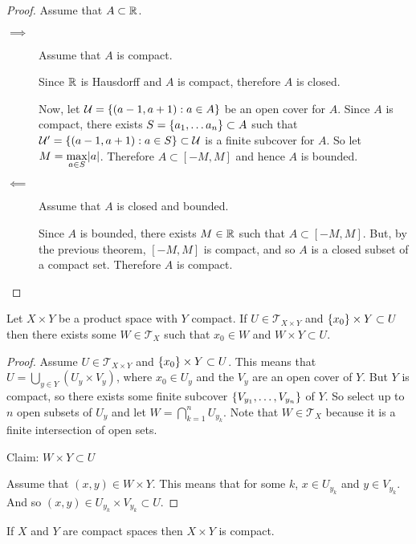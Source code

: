 \documentclass[letterpaper,12pt,fleqn]{article}
\newcommand{\T}{\mathscr{T}}
\newcommand{\U}{\mathcal{U}}
\begin{document}
\begin{proof}
  Assume that \(A\subset\mathbb{R}\).
  \begin{description}
  \item[\(\implies\)] Assume that \(A\) is compact.

    Since \(\mathbb{R}\) is Hausdorff and \(A\) is compact, therefore \(A\) is closed.

    Now, let \(\U=\set{(a-1,a+1):a\in A}\) be an open cover for \(A\).  Since \(A\) is compact, there exists
    \(S=\{a_1,\ldots a_n\}\subset A\) such that \(\U'=\set{(a-1,a+1):a\in S}\subset\U\) is a finite subcover for
    \(A\).  So let \(\displaystyle M=\max_{a\in S}\lvert a\rvert\).  Therefore \(A\subset[-M,M]\) and hence \(A\) is bounded.

  \item[\(\impliedby\)] Assume that \(A\) is closed and bounded.

    Since \(A\) is bounded, there exists \(M\in\mathbb{R}\) such that \(A\subset[-M,M]\).  But, by the previous theorem,
    \([-M,M]\) is compact, and so \(A\) is a closed subset of a compact set.  Therefore \(A\) is compact.
  \end{description}
\end{proof}

\begin{theorem}[6.18]
  Let \(X\times Y\) be a product space with \(Y\) compact.  If \(U\in\T_{X\times Y}\) and
  \(\{x_0\}\times Y\subset U\) then there exists some \(W\in\T_X\) such that \(x_0\in W\) and
  \(W\times Y\subset U\).
\end{theorem}

\begin{proof}
  Assume \(U\in\T_{X\times Y}\) and \(\{x_0\}\times Y\subset U\).  This means that
  \(\displaystyle U=\bigcup_{y\in Y}(U_y\times V_y)\), where \(x_0\in U_y\) and the \(V_y\) are an open cover of \(Y\).
  But \(Y\) is compact, so there exists some finite subcover \(\{V_{y_1},\ldots,V_{y_n}\}\) of \(Y\).  So select
  up to \(n\) open subsets of \(U_y\) and let \(\displaystyle W=\bigcap_{k=1}^nU_{y_k}\).  Note that \(W\in\T_X\)
  because it is a finite intersection of open sets.

  Claim: \(W\times Y\subset U\)

  Assume that \((x,y)\in W\times Y\).  This means that for some \(k\), \(x\in U_{y_k}\) and \(y\in V_{y_k}\).  And so
  \((x,y)\in U_{y_k}\times V_{y_k}\subset U\).
\end{proof}

\begin{theorem}[6.19]
  If \(X\) and \(Y\) are compact spaces then \(X\times Y\) is compact.
\end{theorem}
\end{document}
